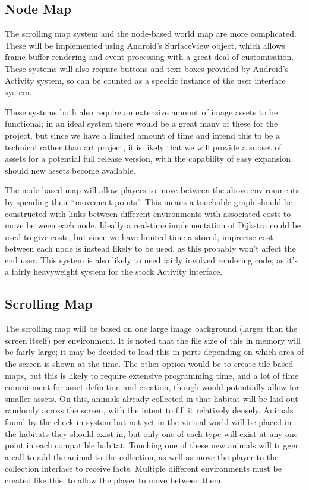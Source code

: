 \documentclass[12pt,a4paper,twoside]{article}
\begin{document}
\subsection{Node Map}
The scrolling map system and the node-based world map are more complicated.
These will be implemented using Android's SurfaceView object, which allows frame buffer rendering and event processing with a great deal of customisation.
These systems will also require buttons and text boxes provided by Android's Activity system, so can be counted as a specific instance of the user interface system.

These systems both also require an extensive amount of image assets to be functional; in an ideal system there would be a great many of these for the project, but since we have a limited amount of time and intend this to be a technical rather than art project, it is likely that we will provide a subset of assets for a potential full release version, with the capability of easy expansion should new assets become available.

The node based map will allow players to move between the above environments by spending their ``movement points''.
This means a touchable graph should be constructed with links between different environments with associated costs to move between each node.
Ideally a real-time implementation of Dijkstra could be used to give costs, but since we have limited time a stored, imprecise cost between each node is instead likely to be used, as this probably won't affect the end user.
This system is also likely to need fairly involved rendering code, as it's a fairly heavyweight system for the stock Activity interface.

\subsection{Scrolling Map}
The scrolling map will be based on one large image background (larger than the screen itself) per environment.
It is noted that the file size of this in memory will be fairly large; it may be decided to load this in parts depending on which area of the screen is shown at the time.
The other option would be to create tile based maps, but this is likely to require extensive programming time, and a lot of time commitment for asset definition and creation, though would potentially allow for smaller assets.
On this, animals already collected in that habitat will be laid out randomly across the screen, with the intent to fill it relatively densely.
Animals found by the check-in system but not yet in the virtual world will be placed in the habitats they should exist in, but only one of each type will exist at any one point in each compatible habitat.
Touching one of these new animals will trigger a call to add the animal to the collection, as well as move the player to the collection interface to receive facts.
Multiple different environments must be created like this, to allow the player to move between them.
\end{document}

